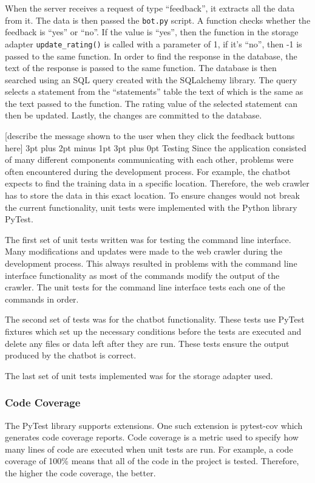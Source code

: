\documentclass[12pt,a4paper]{article}
\makeatletter
\renewcommand\subsection{\@startsection {subsection}{1}{2mm} %
                                        {3pt plus 2pt minus 1pt} %
                                        {3pt plus 0pt} %
                                        {\normalfont\bfseries}}
\makeatother
\begin{document}
When the server receives a request of type “feedback”, it extracts all the data from it. The data is then passed the \texttt{bot.py} script. A function checks whether the feedback is “yes” or “no”. If the value is “yes”, then the function in the storage adapter \texttt{update\_rating()} is called with a parameter of 1, if it’s “no”, then -1 is passed to the same function. In order to find the response in the database, the text of the response is passed to the same function. The database is then searched using an SQL query created with the SQLalchemy library. The query selects a statement from the “statements” table the text of which is the same as the text passed to the function. The rating value of the selected statement can then be updated. Lastly, the changes are committed to the database.

[describe the message shown to the user when they click the feedback buttons here]
\subsection{Testing}
Since the application consisted of many different components communicating with each other, problems were often encountered during the development process. For example, the chatbot expects to find the training data in a specific location. Therefore, the web crawler has to store the data in this exact location. To ensure changes would not break the current functionality, unit tests were implemented with the Python library PyTest. 

The first set of unit tests written was for testing the command line interface. Many modifications and updates were made to the web crawler during the development process. This always resulted in problems with the command line interface functionality as most of the commands modify the output of the crawler. The unit tests for the command line interface tests each one of the commands in order.

The second set of tests was for the chatbot functionality. These tests use PyTest fixtures which set up the necessary conditions before the tests are executed and delete any files or data left after they are run. These tests ensure the output produced by the chatbot is correct. 

The last set of unit tests implemented was for the storage adapter used. 

\subsubsection{Code Coverage}
The PyTest library supports extensions. One such extension is pytest-cov which generates code coverage reports. Code coverage is a metric used to specify how many lines of code are executed when unit tests are run. For example, a code coverage of 100\% means that all of the code in the project is tested. Therefore, the higher the code coverage, the better. 
\end{document}
